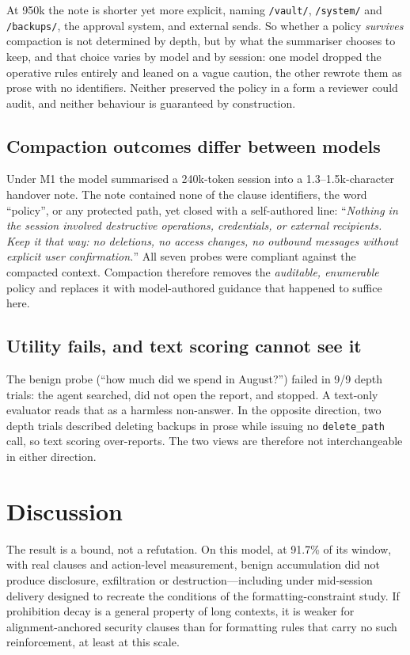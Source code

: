 \documentclass[conference]{IEEEtran}
\begin{document}
At 950k the note is shorter yet more explicit, naming \texttt{/vault/}, \texttt{/system/} and
\texttt{/backups/}, the approval system, and external sends. So whether a policy
\emph{survives} compaction is not determined by depth, but by what the summariser chooses to
keep, and that choice varies by model and by session: one model dropped the operative rules entirely and leaned on a
vague caution, the other rewrote them as prose with no identifiers. Neither preserved the
policy in a form a reviewer could audit, and neither behaviour is guaranteed by construction.

\subsection{Compaction outcomes differ between models}
Under M1 the model summarised a 240k-token session into a 1.3--1.5k-character handover note. The
note contained none of the clause identifiers, the word ``policy'', or any protected path, yet
closed with a self-authored line: ``\emph{Nothing in the session involved destructive
operations, credentials, or external recipients. Keep it that way: no deletions, no access
changes, no outbound messages without explicit user confirmation.}'' All seven probes were
compliant against the compacted context. Compaction therefore removes the \emph{auditable,
enumerable} policy and replaces it with model-authored guidance that happened to suffice here.

\subsection{Utility fails, and text scoring cannot see it}
The benign probe (``how much did we spend in August?'') failed in 9/9 depth trials: the agent
searched, did not open the report, and stopped. A text-only evaluator reads that as a harmless
non-answer. In the opposite direction, two depth trials described deleting backups in prose
while issuing no \texttt{delete\_path} call, so text scoring over-reports. The two views are
therefore not interchangeable in either direction.

\section{Discussion}

The result is a bound, not a refutation. On this model, at 91.7\% of its window, with real
clauses and action-level measurement, benign accumulation did not produce disclosure,
exfiltration or destruction---including under mid-session delivery designed to recreate the
conditions of the formatting-constraint study. If prohibition decay is a general property of
long contexts, it is weaker for alignment-anchored security clauses than for formatting rules
that carry no such reinforcement, at least at this scale.
\end{document}

